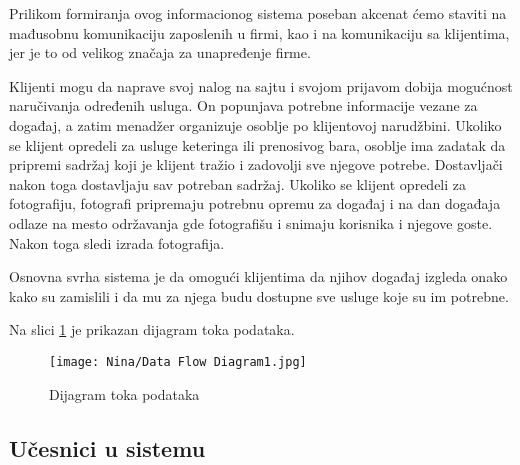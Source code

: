 \documentclass[a4paper]{article}
\begin{document}
Prilikom formiranja ovog informacionog sistema poseban akcenat ćemo staviti na mađusobnu komunikaciju zaposlenih u firmi, kao i na komunikaciju sa klijentima, jer je to od velikog značaja za unapređenje firme.
    
Klijenti mogu da naprave svoj nalog na sajtu i svojom prijavom dobija mogućnost naručivanja određenih usluga. On popunjava potrebne informacije vezane za događaj, a zatim menadžer organizuje osoblje po klijentovoj narudžbini. Ukoliko se klijent opredeli za usluge keteringa ili prenosivog bara, osoblje ima zadatak da pripremi sadržaj koji je klijent tražio i zadovolji sve njegove potrebe. Dostavljači nakon toga dostavljaju sav potreban sadržaj.
Ukoliko se klijent opredeli za fotografiju, fotografi pripremaju potrebnu opremu za događaj i na dan događaja odlaze na mesto održavanja gde fotografišu i snimaju korisnika i njegove goste. Nakon toga sledi izrada fotografija. 
    
Osnovna svrha sistema je da omogući klijentima da njihov događaj izgleda onako kako su zamislili i da mu za njega budu dostupne sve usluge koje su im potrebne. 

Na slici \ref{fig:Tok} je prikazan dijagram toka podataka.
    
    \begin{figure}[H]
    \centering
    \texttt{[image: Nina/Data Flow Diagram1.jpg]}
    \caption{Dijagram toka podataka}
    \label{fig:Tok}
\end{figure}
    
    \subsection{Učesnici u sistemu}
    
\end{document}
